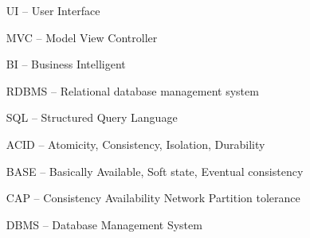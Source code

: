 \begin{itemize}[leftmargin=2cm, topsep=0pt, partopsep=5pt,itemsep=0pt,parsep=0pt]
\item[UI --] User Interface
\item[MVC --] Model View Controller
\item[BI --] Business Intelligent
\item[RDBMS --] Relational database management system
\item[SQL --] Structured Query Language
\item[ACID --] Atomicity, Consistency, Isolation, Durability
\item[BASE --] Basically Available, Soft state, Eventual consistency
\item[CAP --] Consistency Availability Network Partition tolerance
\item[DBMS --] Database Management System
\end{itemize}